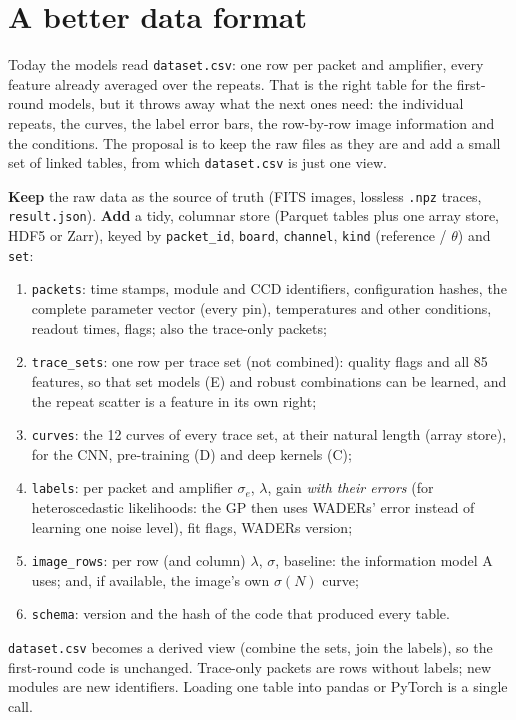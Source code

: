 \documentclass[10pt]{article}
\newcommand{\code}[1]{\texttt{#1}}
\begin{document}
\section{A better data format}
\label{sec:format}

\begin{basic}
Today the models read \code{dataset.csv}: one row per packet and amplifier, every feature already averaged over the repeats. That is
the right table for the first-round models, but it throws away what the next ones need: the individual repeats, the curves, the label
error bars, the row-by-row image information and the conditions. The proposal is to keep the raw files as they are and add a small set
of linked tables, from which \code{dataset.csv} is just one view.
\end{basic}

\begin{advanced}
\textbf{Keep} the raw data as the source of truth (FITS images, lossless \code{.npz} traces, \code{result.json}). \textbf{Add} a tidy,
columnar store (Parquet tables plus one array store, HDF5 or Zarr), keyed by \code{packet\_id}, \code{board}, \code{channel}, \code{kind}
(reference / $\theta$) and \code{set}:
\begin{enumerate}
\item \code{packets}: time stamps, module and CCD identifiers, configuration hashes, the complete parameter vector (every pin),
  temperatures and other conditions, readout times, flags; also the trace-only packets;
\item \code{trace\_sets}: one row per trace set (not combined): quality flags and all 85 features, so that set models (E) and robust
  combinations can be learned, and the repeat scatter is a feature in its own right;
\item \code{curves}: the 12 curves of every trace set, at their natural length (array store), for the CNN, pre-training (D) and deep kernels (C);
\item \code{labels}: per packet and amplifier $\sigma_e$, $\lambda$, gain \emph{with their errors} (for heteroscedastic likelihoods: the GP
  then uses WADERs' error instead of learning one noise level), fit flags, WADERs version;
\item \code{image\_rows}: per row (and column) $\lambda$, $\sigma$, baseline: the information model A uses; and, if available, the image's own
  $\sigma(N)$ curve;
\item \code{schema}: version and the hash of the code that produced every table.
\end{enumerate}
\code{dataset.csv} becomes a derived view (combine the sets, join the labels), so the first-round code is unchanged. Trace-only packets
are rows without labels; new modules are new identifiers. Loading one table into pandas or PyTorch is a single call.
\end{advanced}
\end{document}
